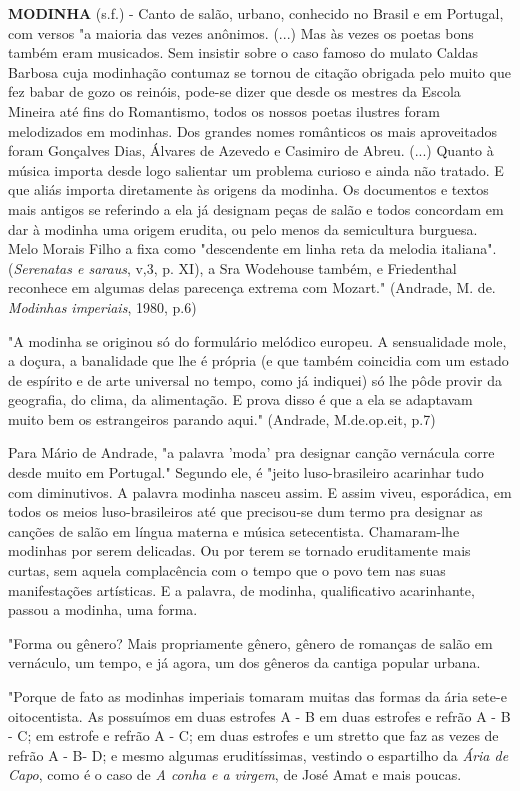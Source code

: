 \textbf{MODINHA} (s.f.) - Canto de salão, urbano, conhecido no Brasil e
em Portugal, com versos "a maioria das vezes anônimos. (...) Mas às
vezes os poetas bons também eram musicados. Sem insistir sobre o caso
famoso do mulato Caldas Barbosa cuja modinhação contumaz se tornou de
citação obrigada pelo muito que fez babar de gozo os reinóis, pode-se
dizer que desde os mestres da Escola Mineira até fins do Romantismo,
todos os nossos poetas ilustres foram melodizados em modinhas. Dos
grandes nomes românticos os mais aproveitados foram Gonçalves Dias,
Álvares de Azevedo e Casimiro de Abreu. (...) Quanto à música importa
desde logo salientar um problema curioso e ainda não tratado. E que
aliás importa diretamente às origens da modinha. Os documentos e textos
mais antigos se referindo a ela já designam peças de salão e todos
concordam em dar à modinha uma origem erudita, ou pelo menos da
semicultura burguesa. Melo Morais Filho a fixa como "descendente em
linha reta da melodia italiana". (\emph{Serenatas e saraus}, v,3, p.
XI), a Sra Wodehouse também, e Friedenthal reconhece em algumas delas
parecença extrema com Mozart." (Andrade, M. de. \emph{Modinhas
imperiais}, 1980, p.6)

"A modinha se originou só do formulário melódico europeu. A sensualidade
mole, a doçura, a banalidade que lhe é própria (e que também coincidia
com um estado de espírito e de arte universal no tempo, como já
indiquei) só lhe pôde provir da geografia, do clima, da alimentação. E
prova disso é que a ela se adaptavam muito bem os estrangeiros parando
aqui." (Andrade, M.de.op.eit, p.7)

Para Mário de Andrade, "a palavra 'moda' pra designar canção vernácula
corre desde muito em Portugal." Segundo ele, é "jeito luso-brasileiro
acarinhar tudo com diminutivos. A palavra modinha nasceu assim. E assim
viveu, esporádica, em todos os meios luso-brasileiros até que
precisou-se dum termo pra designar as canções de salão em língua materna
e música setecentista. Chamaram-lhe modinhas por serem delicadas. Ou por
terem se tornado eruditamente mais curtas, sem aquela complacência com o
tempo que o povo tem nas suas manifestações artísticas. E a palavra, de
modinha, qualificativo acarinhante, passou a modinha, uma forma.

"Forma ou gênero? Mais propriamente gênero, gênero de romanças de salão
em vernáculo, um tempo, e já agora, um dos gêneros da cantiga popular
urbana.

"Porque de fato as modinhas imperiais tomaram muitas das formas da ária
sete-e oitocentista. As possuímos em duas estrofes A - B em duas
estrofes e refrão A - B - C; em estrofe e refrão A - C; em duas estrofes
e um stretto que faz as vezes de refrão A - B- D; e mesmo algumas
eruditíssimas, vestindo o espartilho da \emph{Ária de Capo}, como é o
caso de \emph{A conha e a virgem}, de José Amat e mais poucas.

